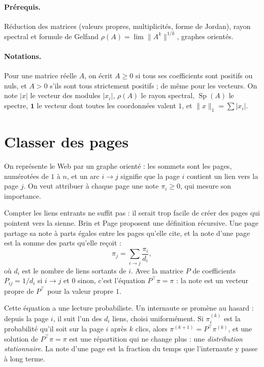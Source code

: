 \documentclass[11pt,a4paper]{article}
\theoremstyle{plain}
\theoremstyle{definition}
\theoremstyle{remark}
\newcommand{\un}{\mathbf{1}}
\DeclareMathOperator{\Sp}{Sp}
\begin{document}
\paragraph{Prérequis.} Réduction des matrices (valeurs propres, multiplicités, forme de Jordan), rayon spectral et formule de Gelfand $\rho(A)=\lim\|A^k\|^{1/k}$, graphes orientés.

\paragraph{Notations.} Pour une matrice réelle $A$, on écrit $A\geq0$ si tous ses coefficients sont positifs ou nuls, et $A>0$ s'ils sont tous strictement positifs ; de même pour les vecteurs. On note $|x|$ le vecteur des modules $|x_i|$, $\rho(A)$ le rayon spectral, $\Sp(A)$ le spectre, $\un$ le vecteur dont toutes les coordonnées valent $1$, et $\|x\|_1=\sum|x_i|$.

\tableofcontents

\section{Classer des pages}

On représente le Web par un graphe orienté : les sommets sont les pages, numérotées de $1$ à $n$, et un arc $i\to j$ signifie que la page $i$ contient un lien vers la page $j$. On veut attribuer à chaque page une note $\pi_i\geq0$, qui mesure son importance.

Compter les liens entrants ne suffit pas : il serait trop facile de créer des pages qui pointent vers la sienne. Brin et Page proposent une définition récursive. Une page partage sa note à parts égales entre les pages qu'elle cite, et la note d'une page est la somme des parts qu'elle reçoit :
\[
  \pi_j=\sum_{i\to j}\frac{\pi_i}{d_i},
\]
où $d_i$ est le nombre de liens sortants de $i$. Avec la matrice $P$ de coefficients $P_{ij}=1/d_i$ si $i\to j$ et $0$ sinon, c'est l'équation $P^\top\pi=\pi$ : la note est un vecteur propre de $P^\top$ pour la valeur propre $1$.

Cette équation a une lecture probabiliste. Un internaute se promène au hasard : depuis la page $i$, il suit l'un des $d_i$ liens, choisi uniformément. Si $\pi^{(k)}_i$ est la probabilité qu'il soit sur la page $i$ après $k$ clics, alors $\pi^{(k+1)}=P^\top\pi^{(k)}$, et une solution de $P^\top\pi=\pi$ est une répartition qui ne change plus : une \emph{distribution stationnaire}. La note d'une page est la fraction du temps que l'internaute y passe à long terme.
\end{document}
